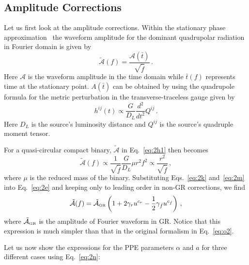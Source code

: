 \documentclass[prd,twocolumn,nofootinbib]{revtex4-1}
\newcommand{\GR}{{\mbox{\tiny GR}}}
\begin{document}
 \subsection{Amplitude Corrections}
 
Let us first look at the amplitude corrections.  Within the stationary phase approximation~\cite{PhysRevD.62.084036,Yunes:2009yz} the waveform amplitude for the dominant quadrupolar radiation in Fourier domain is given by
 \begin{equation}\label{eq:2h1}
\tilde{\mathcal{A}}(f)=\frac{\mathcal{A}(\bar{t})}{\sqrt{\dot{f}}}\,.
\end{equation}
Here $\mathcal A$ is the waveform amplitude in the time domain while $\bar t (f)$ represents time at the stationary point. $A(\bar t)$ can be obtained by using the quadrupole formula for the metric perturbation in the transverse-traceless gauge given by~\cite{Blanchet:2002av}
 \begin{equation}\label{eq:2h2}
h^{ij}(t)\propto \frac{G}{D_L}\frac{d^2 }{d t^2}Q^{ij}\,.
 \end{equation}
Here $D_L$ is the source's luminosity distance and $Q^{ij}$ is the source's quadruple moment tensor. 

For a quasi-circular compact binary, $\tilde{\mathcal{A}}$ in Eq.~\eqref{eq:2h1} then becomes
\begin{equation}\label{eq:2e}
\tilde{\mathcal{A}}(f) \propto\frac{1}{\sqrt{\dot{f}}}\frac{G}{D_L}\mu r^2f^2 \propto \frac{r^2}{\sqrt{\dot{f}}}  \,,
\end{equation}
where $\mu$ is the reduced mass of the binary.
Substituting Eqs.~\eqref{eq:2k} and~\eqref{eq:2m} into Eq.~\eqref{eq:2e} and keeping only to leading order in non-GR corrections, we find
\begin{equation}\label{eq:2n}
\tilde{\mathcal{A}}(f)=\tilde{\mathcal{A}}_{\GR} \left(1+2\gamma_ru^{c_r}-\frac{1}{2}\gamma_{\dot{f}}u^{c_{\dot{f}}}\right)\,,
\end{equation}
where $\tilde{\mathcal{A}}_{\GR} $ is the amplitude of Fourier waveform in GR. Notice that this expression is much simpler than that in the original formalism in Eq.~\eqref{eq:o2}.

Let us now show the expressions for the PPE parameters $\alpha$ and $a$ for three different cases using Eq.~\eqref{eq:2n}:
\end{document}
